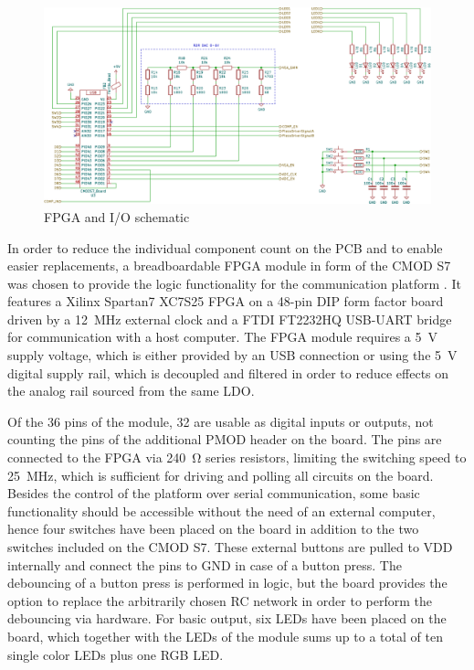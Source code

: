 \documentclass[
	english,
	ruledheaders=section, %
	class=report,%
	thesis={type=Project Seminar Report},%
	accentcolor=TUDa-1d, %
	custommargins=false,%
	marginpar=false,%
	parskip=half-,%
	fontsize=11pt,%
]{tudapub}
\begin{document}
\begin{figure}[H]
    \centering
    \includegraphics[width=1.0\columnwidth]{schematics/sch_fpga.pdf}
    \caption{\gls{FPGA} and I/O schematic}
    \label{sch:fpga}
\end{figure}
In order to reduce the individual component count on the \gls{PCB} and to enable easier replacements, a breadboardable \gls{FPGA} module in form of the CMOD S7 was chosen to provide the logic functionality for the communication platform \autocite{digilentBreadboardableSpartan7FPGA}. It features a Xilinx Spartan7 XC7S25 \gls{FPGA} on a 48-pin \gls{DIP} form factor board driven by a \SI{12}{\mega\hertz} external clock and a FTDI FT2232HQ USB-UART bridge for communication with a host computer. The \gls{FPGA} module requires a \SI{5}{\volt} supply voltage, which is either provided by an USB connection or using the \SI{5}{\volt} digital supply rail, which is decoupled and filtered in order to reduce effects on the analog rail sourced from the same \gls{LDO}.

Of the 36 pins of the module, 32 are usable as digital inputs or outputs, not counting the pins of the additional PMOD header on the board. The pins are connected to the \gls{FPGA} via \SI{240}{\ohm} series resistors, limiting the switching speed to \SI{25}{\mega\hertz}, which is sufficient for driving and polling all circuits on the board. Besides the control of the platform over serial communication, some basic functionality should be accessible without the need of an external computer, hence four switches have been placed on the board in addition to the two switches included on the CMOD S7. These external buttons are pulled to VDD internally and connect the pins to GND in case of a button press. The debouncing of a button press is performed in logic, but the board provides the option to replace the arbitrarily chosen RC network in order to perform the debouncing via hardware. For basic output, six \glspl{LED} have been placed on the board, which together with the \glspl{LED} of the module sums up to a total of ten single color \glspl{LED} plus one RGB \gls{LED}.
\end{document}
